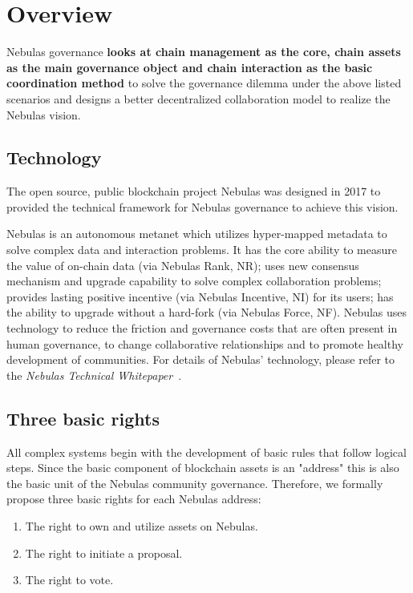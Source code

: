\section{Overview}

Nebulas governance \textbf{looks at chain management as the core, chain assets as the main governance object and chain interaction as the basic coordination method} to solve the governance dilemma under the above listed scenarios and designs a better decentralized collaboration model to realize the Nebulas vision.

\subsection{Technology}

The open source, public blockchain project Nebulas was designed in 2017 to provided the technical framework for Nebulas governance to achieve this vision.

Nebulas is an autonomous metanet which utilizes hyper-mapped metadata to solve complex data and interaction problems. It has the core ability to measure the value of on-chain data (via Nebulas Rank, NR); uses new consensus mechanism and upgrade capability to solve complex collaboration problems; provides lasting positive incentive (via Nebulas Incentive, NI) for its users; has the ability to upgrade without a hard-fork (via Nebulas Force, NF). Nebulas uses technology to reduce the friction and governance costs that are often present in human governance, to change collaborative relationships and to promote healthy development of communities. For details of Nebulas' technology, please refer to the \textit{Nebulas Technical Whitepaper}~\cite{TechWhitepaper}.


\subsection{Three basic rights}
\label{rights}

All complex systems begin with the development of basic rules that follow logical steps. Since the basic component of blockchain assets is an "address" this is also the basic unit of the Nebulas community governance. Therefore, we formally propose three basic rights for each Nebulas address:

\begin{enumerate}
	\item The right to own and utilize assets on Nebulas.
	\item The right to initiate a proposal.
	\item The right to vote.
\end{enumerate}

